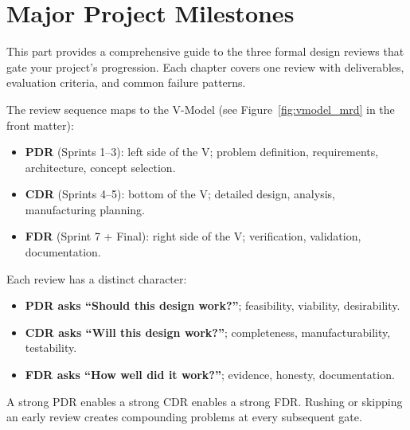 \part{Major Project Milestones}

This part provides a comprehensive guide to the three formal design reviews that gate your project's progression. Each chapter covers one review with deliverables, evaluation criteria, and common failure patterns.


The review sequence maps to the V-Model (see Figure~\ref{fig:vmodel_mrd} in the front matter):
\begin{itemize}[nosep,leftmargin=1.5em]
\item \textbf{PDR} (Sprints 1--3): left side of the V; problem definition, requirements, architecture, concept selection.
\item \textbf{CDR} (Sprints 4--5): bottom of the V; detailed design, analysis, manufacturing planning.
\item \textbf{FDR} (Sprint 7 + Final): right side of the V; verification, validation, documentation.
\end{itemize}

Each review has a distinct character:
\begin{itemize}[nosep,leftmargin=1.5em]
\item \textbf{PDR asks ``Should this design work?''}; feasibility, viability, desirability.
\item \textbf{CDR asks ``Will this design work?''}; completeness, manufacturability, testability.
\item \textbf{FDR asks ``How well did it work?''}; evidence, honesty, documentation.
\end{itemize}

A strong PDR enables a strong CDR enables a strong FDR. Rushing or skipping an early review creates compounding problems at every subsequent gate.

